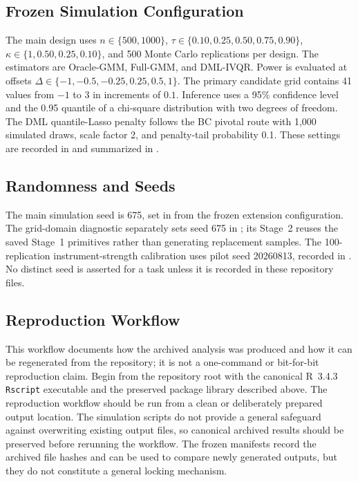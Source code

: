 \subsection{Frozen Simulation Configuration}

The main design uses $n\in\{500,1000\}$, $\tau\in\{0.10,0.25,0.50,0.75,0.90\}$, $\kappa\in\{1,0.50,0.25,0.10\}$, and 500 Monte Carlo replications per design. The estimators are Oracle-GMM, Full-GMM, and DML-IVQR. Power is evaluated at offsets $\Delta\in\{-1,-0.5,-0.25,0.25,0.5,1\}$. The primary candidate grid contains 41 values from $-1$ to $3$ in increments of $0.1$. Inference uses a 95\% confidence level and the 0.95 quantile of a chi-square distribution with two degrees of freedom. The DML quantile-Lasso penalty follows the BC pivotal route with 1,000 simulated draws, scale factor 2, and penalty-tail probability 0.1. These settings are recorded in  and summarized in .

\subsection{Randomness and Seeds}

The main simulation seed is 675, set in  from the frozen extension configuration. The grid-domain diagnostic separately sets seed 675 in ; its Stage~2 reuses the saved Stage~1 primitives rather than generating replacement samples. The 100-replication instrument-strength calibration uses pilot seed 20260813, recorded in . No distinct seed is asserted for a task unless it is recorded in these repository files.

\subsection{Reproduction Workflow}

This workflow documents how the archived analysis was produced and how it can be regenerated from the repository; it is not a one-command or bit-for-bit reproduction claim. Begin from the repository root with the canonical R~3.4.3 \texttt{Rscript} executable and the preserved package library described above. The reproduction workflow should be run from a clean or deliberately prepared output location. The simulation scripts do not provide a general safeguard against overwriting existing output files, so canonical archived results should be preserved before rerunning the workflow. The frozen manifests record the archived file hashes and can be used to compare newly generated outputs, but they do not constitute a general locking mechanism.

